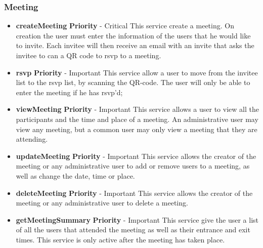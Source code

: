 \documentclass{article}
\begin{document}
		\subsubsection{Meeting}
		\begin{itemize}
			\item \textbf{createMeeting}
				\newline\textbf{ Priority } - Critical
				\newline This service create a meeting. On creation the user must enter the information of the users that he would like to invite. Each invitee will then receive an email with an invite that asks the invitee to can a QR code to rsvp to a meeting.
			\item \textbf{rsvp}
				\newline\textbf{ Priority } - Important
				\newline This service allow a user to move from the invitee list to the rsvp list, by scanning the QR-code. The user will only be able to enter the meeting if he has rsvp'd;
			\item \textbf{viewMeeting}
				\newline\textbf{ Priority } - Important
				\newline This service allows a user to view all the participants and the time and place of a meeting. An administrative user may view any meeting, but a common user may only view a meeting that they are attending.
			\item \textbf{updateMeeting}
				\newline\textbf{ Priority } - Important
				\newline This service allows the creator of the meeting or any administrative user to add or remove users to a meeting, as well as change the date, time or place.
			\item \textbf{deleteMeeting}
				\newline\textbf{ Priority } - Important
				\newline This service allows the creator of the meeting or any administrative user to delete a meeting.
			\item \textbf{getMeetingSummary}
				\newline\textbf{ Priority } - Important
				\newline This service give the user a list of all the users that attended the meeting as well as their entrance and exit times. This service is only active after the meeting has taken place.

		\end{itemize}
\end{document}

